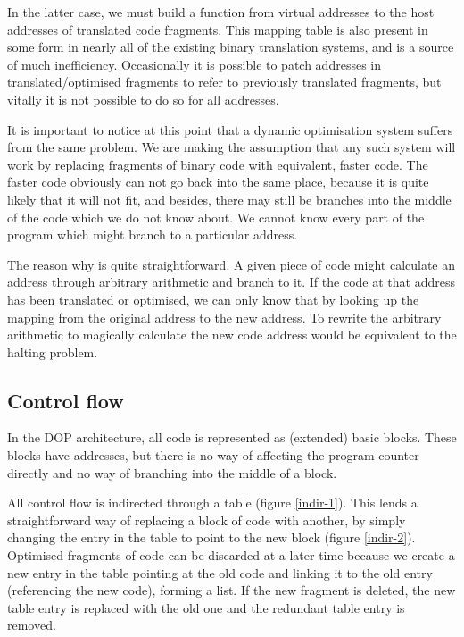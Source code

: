 \documentclass[11pt,letterpaper,twocolumn,notitlepage]{article}
\begin{document}
In the latter case, we must build a function from virtual addresses to the host addresses of translated code fragments. This mapping table is also present in some form in nearly all of the existing binary translation systems, and is a source of much inefficiency. Occasionally it is possible to patch addresses in translated/optimised fragments to refer to previously translated fragments, but vitally it is not possible to do so for all addresses.

It is important to notice at this point that a dynamic optimisation system suffers from the same problem. We are making the assumption that any such system will work by replacing fragments of binary code with equivalent, faster code. The faster code obviously can not go back into the same place, because it is quite likely that it will not fit, and besides, there may still be branches into the middle of the code which we do not know about. We cannot know every part of the program which might branch to a particular address.

The reason why is quite straightforward. A given piece of code might calculate an address through arbitrary arithmetic and branch to it. If the code at that address has been translated or optimised, we can only know that by looking up the mapping from the original address to the new address. To rewrite the arbitrary arithmetic to magically calculate the new code address would be equivalent to the halting problem.

\subsection{Control flow}

In the DOP architecture, all code is represented as (extended) basic blocks. These blocks have addresses, but there is no way of affecting the program counter directly and no way of branching into the middle of a block.

All control flow is indirected through a table (figure \ref{indir-1}). This lends a straightforward way of replacing a block of code with another, by simply changing the entry in the table to point to the new block (figure \ref{indir-2}). Optimised fragments of code can be discarded at a later time because we create a new entry in the table pointing at the old code and linking it to the old entry (referencing the new code), forming a list. If the new fragment is deleted, the new table entry is replaced with the old one and the redundant table entry is removed.
\end{document}
